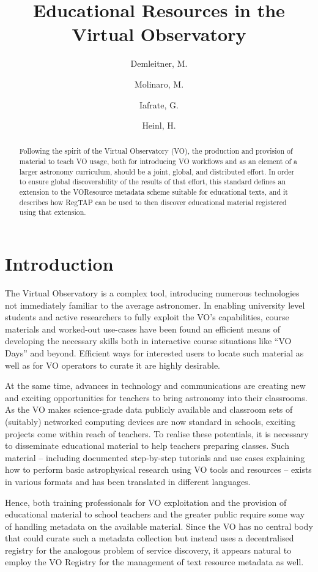 \documentclass{ivoa}
\author{Demleitner, M.}
\author{Molinaro, M.}
\author{Iafrate, G.}
\author{Heinl, H.}
\title{Educational Resources in the Virtual Observatory}
\begin{document}
\begin{abstract}
Following the spirit of the Virtual Observatory (VO), the production and
provision of material to teach VO usage, both for introducing VO
workflows and as an element of a larger astronomy curriculum, should be
a joint, global, and distributed effort.  In order to ensure global
discoverability of the results of that effort, this standard defines an
extension to the VOResource metadata scheme suitable for educational
texts, and it describes how RegTAP can be used to then discover
educational material registered using that extension.

\end{abstract}


\section{Introduction}

The Virtual Observatory is a complex tool, introducing numerous
technologies not immediately familiar to the average astronomer.
In enabling university level students
and active researchers to fully exploit the VO's capabilities, course
materials and worked-out use-cases have been found an efficient means of
developing the necessary skills both in interactive course situations
like ``VO Days'' and beyond.
Efficient ways for interested users to locate such
material as well as for VO operators to curate it are highly desirable.

At the same time, advances in technology and
communications are creating new and exciting
opportunities for teachers to bring astronomy into their
classrooms.  As the VO makes science-grade data publicly available and
classroom sets of (suitably) networked computing devices are now
standard in schools, exciting projects come within
reach of teachers.  To realise these potentials,
it is necessary to disseminate educational material to help teachers
preparing classes.  Such material -- including documented step-by-step
tutorials and use cases explaining how to perform basic astrophysical research
using VO tools and resources -- exists in various formats and
has been translated in different languages.

Hence, both training professionals for VO exploitation and the provision
of educational material to school teachers and the greater public
require some way of handling metadata on the available material.  Since
the VO has no central body that could curate such a metadata collection
but instead uses a decentralised registry for the analogous problem of
service discovery, it appears natural to employ the VO Registry for the
management of text resource metadata as well.
\end{document}
